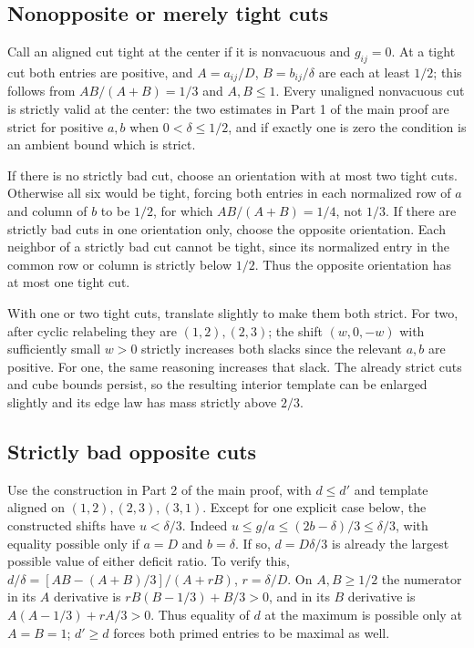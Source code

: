 \documentclass[
  10pt,
]{article}
\begin{document}
\subsection{Nonopposite or merely tight
cuts}\label{nonopposite-or-merely-tight-cuts}

Call an aligned cut tight at the center if it is nonvacuous and
\(g_{ij}=0\). At a tight cut both entries are positive, and
\(A=a_{ij}/D\), \(B=b_{ij}/\delta\) are each at least \(1/2\); this
follows from \(AB/(A+B)=1/3\) and \(A,B\le1\). Every unaligned
nonvacuous cut is strictly valid at the center: the two estimates in
Part 1 of the main proof are strict for positive \(a,b\) when
\(0<\delta\le1/2\), and if exactly one is zero the condition is an
ambient bound which is strict.

If there is no strictly bad cut, choose an orientation with at most two
tight cuts. Otherwise all six would be tight, forcing both entries in
each normalized row of \(a\) and column of \(b\) to be \(1/2\), for
which \(AB/(A+B)=1/4\), not \(1/3\). If there are strictly bad cuts in
one orientation only, choose the opposite orientation. Each neighbor of
a strictly bad cut cannot be tight, since its normalized entry in the
common row or column is strictly below \(1/2\). Thus the opposite
orientation has at most one tight cut.

With one or two tight cuts, translate slightly to make them both strict.
For two, after cyclic relabeling they are \((1,2),(2,3)\); the shift
\((w,0,-w)\) with sufficiently small \(w>0\) strictly increases both
slacks since the relevant \(a,b\) are positive. For one, the same
reasoning increases that slack. The already strict cuts and cube bounds
persist, so the resulting interior template can be enlarged slightly and
its edge law has mass strictly above \(2/3\).

\subsection{Strictly bad opposite
cuts}\label{strictly-bad-opposite-cuts}

Use the construction in Part 2 of the main proof, with \(d\le d'\) and
template aligned on \((1,2),(2,3),(3,1)\). Except for one explicit case
below, the constructed shifts have \(u<\delta/3\). Indeed
\(u\le g/a\le(2b-\delta)/3\le\delta/3\), with equality possible only if
\(a=D\) and \(b=\delta\). If so, \(d=D\delta/3\) is already the largest
possible value of either deficit ratio. To verify this,
\(d/\delta=[AB-(A+B)/3]/(A+rB)\), \(r=\delta/D\). On \(A,B\ge1/2\) the
numerator in its \(A\) derivative is \(rB(B-1/3)+B/3>0\), and in its
\(B\) derivative is \(A(A-1/3)+rA/3>0\). Thus equality of \(d\) at the
maximum is possible only at \(A=B=1\); \(d'\ge d\) forces both primed
entries to be maximal as well.
\end{document}
